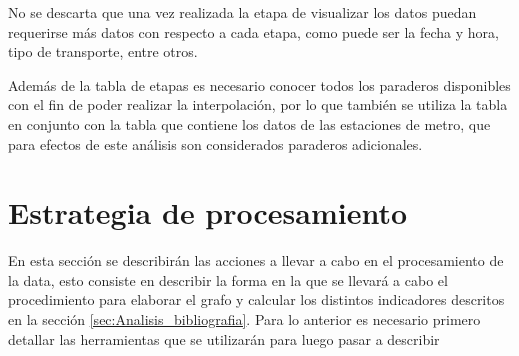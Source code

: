 \documentclass[12pt]{article}
\begin{document}
\begin{center}
\begin{tabular}{| l | p{7cm} |}
  \end{tabular}
\end{center}

No se descarta que una vez realizada la etapa de visualizar los datos puedan requerirse más datos con respecto a cada etapa, como puede ser la fecha y hora, tipo de transporte, entre otros.

Además de la tabla de etapas es necesario conocer todos los paraderos disponibles con el fin de poder realizar la interpolación, por lo que también se utiliza la tabla  en conjunto con la tabla  que contiene los datos de las estaciones de metro, que para efectos de este análisis son considerados paraderos adicionales.


    \newpage
    \section{Estrategia de procesamiento}
  
	En esta sección se describirán las acciones a llevar a cabo en el procesamiento de la data, esto consiste en describir la forma en la que se llevará a cabo el procedimiento para elaborar el grafo y calcular los distintos indicadores descritos en la sección \ref{sec:Analisis_bibliografia}. Para lo anterior es necesario primero detallar las herramientas que se utilizarán para luego pasar a describir 
\end{document}
